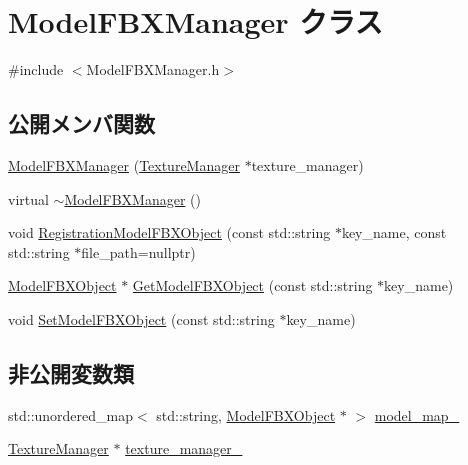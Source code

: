 \hypertarget{class_model_f_b_x_manager}{}\section{Model\+F\+B\+X\+Manager クラス}
\label{class_model_f_b_x_manager}


{\ttfamily \#include $<$Model\+F\+B\+X\+Manager.\+h$>$}

\subsection*{公開メンバ関数}
\begin{DoxyCompactItemize}
\item 
\mbox{\hyperlink{class_model_f_b_x_manager_a56089e9327a1739e3b88dada724bd898}{Model\+F\+B\+X\+Manager}} (\mbox{\hyperlink{class_texture_manager}{Texture\+Manager}} $\ast$texture\+\_\+manager)
\item 
virtual \mbox{\hyperlink{class_model_f_b_x_manager_a6714c69d45e3aad2d0d04b0d1a69d2dc}{$\sim$\+Model\+F\+B\+X\+Manager}} ()
\item 
void \mbox{\hyperlink{class_model_f_b_x_manager_a9a010cad6b7ddf07169daec28807b143}{Registration\+Model\+F\+B\+X\+Object}} (const std\+::string $\ast$key\+\_\+name, const std\+::string $\ast$file\+\_\+path=nullptr)
\item 
\mbox{\hyperlink{class_model_f_b_x_object}{Model\+F\+B\+X\+Object}} $\ast$ \mbox{\hyperlink{class_model_f_b_x_manager_abff9802a7edef85fd3b5de53d1d0b177}{Get\+Model\+F\+B\+X\+Object}} (const std\+::string $\ast$key\+\_\+name)
\item 
void \mbox{\hyperlink{class_model_f_b_x_manager_a1b25dfc755e529dc5f61913697ef99d1}{Set\+Model\+F\+B\+X\+Object}} (const std\+::string $\ast$key\+\_\+name)
\end{DoxyCompactItemize}
\subsection*{非公開変数類}
\begin{DoxyCompactItemize}
\item 
std\+::unordered\+\_\+map$<$ std\+::string, \mbox{\hyperlink{class_model_f_b_x_object}{Model\+F\+B\+X\+Object}} $\ast$ $>$ \mbox{\hyperlink{class_model_f_b_x_manager_adac581d36a055c584179261b328d1909}{model\+\_\+map\+\_\+}}
\item 
\mbox{\hyperlink{class_texture_manager}{Texture\+Manager}} $\ast$ \mbox{\hyperlink{class_model_f_b_x_manager_ab44f914c3afd05163a190a55022e3f7b}{texture\+\_\+manager\+\_\+}}
\end{DoxyCompactItemize}


